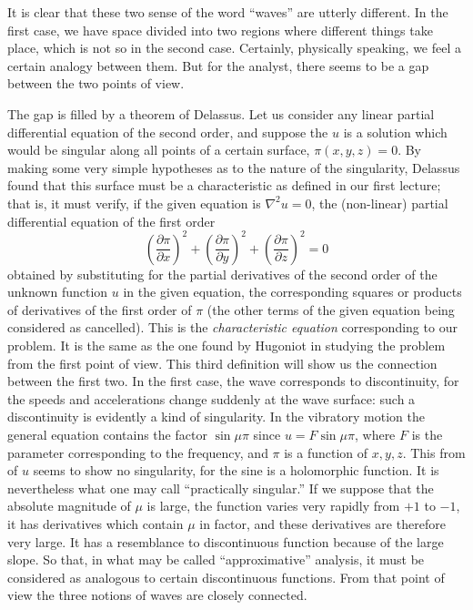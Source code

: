 \documentclass[12pt,oneside]{book}
\begin{document}
It is clear that these two sense of the word ``waves'' are utterly different. In
the first case, we have space divided into two regions where different things
take place, which is not so in the second case. Certainly, physically speaking,
we feel a certain analogy between them. But for the analyst, there seems to be a
gap between the two points of view. \par

The gap is filled by a theorem of Delassus. Let us consider any linear partial
differential equation of the second order, and suppose the $u$ is a solution
which would be singular along all points of a certain surface, $\pi(x,y,z)=0$.
By making some very simple hypotheses as to the nature of the singularity,
Delassus found that this surface must be a characteristic as defined in our
first lecture; that is, it must verify, if the given equation is $\nabla^2u=0$,
the (non-linear) partial differential equation of the first order
$$\left(\frac{\partial\pi}{\partial x}\right)^2+\left(\frac{\partial\pi}{\partial y}\right)^2+\left(\frac{\partial\pi}{\partial z}\right)^2=0$$
obtained by substituting for the partial derivatives of the second order of the
unknown function $u$ in the given equation, the corresponding squares or
products of derivatives of the first order of $\pi$ (the other terms of the
given equation being considered as cancelled). This is the
\textit{characteristic equation} corresponding to our problem. It is the same as
the one found by Hugoniot in studying the problem from the first point of view.
This third definition will show us the connection between the first two. In the
first case, the wave corresponds to discontinuity, for the speeds and
accelerations change suddenly at the wave surface: such a discontinuity is
evidently a kind of singularity. In the vibratory motion the general equation
contains the factor $\sin\mu\pi$ since $u=F\sin\mu\pi$, where $F$ is the
parameter corresponding to the frequency, and $\pi$ is a function of $x,y,z$.
This from of $u$ seems to show no singularity, for the sine is a holomorphic
function. It is nevertheless what one may call ``practically singular.'' If we
suppose that the absolute magnitude of $\mu$ is large, the function varies very
rapidly from $+1$ to $-1$, it has derivatives which contain $\mu$ in factor, and
these derivatives are therefore very large. It has a resemblance to
discontinuous function because of the large slope. So that, in what may be
called ``approximative'' analysis, it must be considered as analogous to certain
discontinuous functions. From that point of view the three notions of waves are
closely connected. \par
\end{document}
